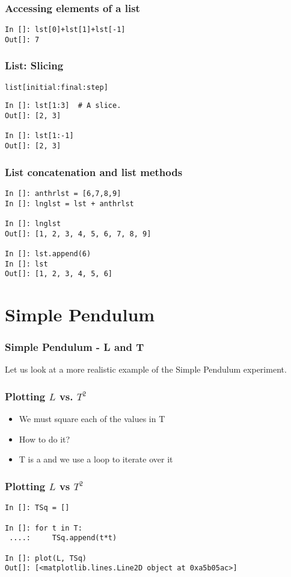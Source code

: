 \documentclass[14pt,compress]{beamer}
\newcounter{time}
\newcommand{\inctime}[1]{\addtocounter{time}{#1}{\tiny \thetime\ m}}
\newcommand{\typ}[1]{\lstinline{#1}}
\newcommand{\kwrd}[1]{ \texttt{\textbf{\color{blue}{#1}}}  }
\begin{document}
\begin{frame}[fragile]
\frametitle{Accessing elements of a list}
\begin{lstlisting}
In []: lst[0]+lst[1]+lst[-1]
Out[]: 7
\end{lstlisting}
\end{frame}

\begin{frame}[fragile]
  \frametitle{List: Slicing}
\alert{\typ{list[initial:final:step]}}
\begin{lstlisting}
In []: lst[1:3]  # A slice.
Out[]: [2, 3]

In []: lst[1:-1]
Out[]: [2, 3]
\end{lstlisting}
\end{frame}

\begin{frame}[fragile]
  \frametitle{List concatenation and list methods}
\begin{lstlisting}
In []: anthrlst = [6,7,8,9]
In []: lnglst = lst + anthrlst

In []: lnglst
Out[]: [1, 2, 3, 4, 5, 6, 7, 8, 9]

In []: lst.append(6)
In []: lst
Out[]: [1, 2, 3, 4, 5, 6]
\end{lstlisting}
\end{frame}

\section{Simple Pendulum}
\begin{frame}[fragile]
\frametitle{Simple Pendulum - L and T}
Let us look at a more realistic example of the Simple Pendulum experiment.
\end{frame}

\begin{frame}[fragile]
\frametitle{Plotting $L$ vs. $T^2$}
\begin{itemize}
\item We must square each of the values in T
\item How to do it?
\item T is a \kwrd{list} and we use a \kwrd{for} loop to iterate over it
\end{itemize}
\end{frame}

\begin{frame}[fragile]
\frametitle{Plotting $L$ vs $T^2$}
\begin{lstlisting}
In []: TSq = []

In []: for t in T:
 ....:     TSq.append(t*t)

In []: plot(L, TSq)
Out[]: [<matplotlib.lines.Line2D object at 0xa5b05ac>]
\end{lstlisting}
\end{frame}
\end{document}
